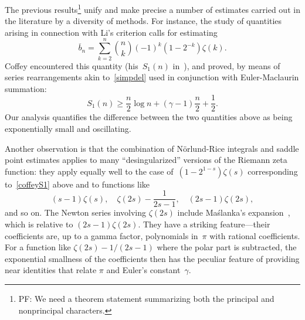 \documentclass{amsart}
\begin{document}
\smallskip
The previous results\footnote{%
	PF: We need a theorem statement summarizing both the principal and nonprincipal
	characters.}
unify and make precise a number of estimates carried out in the literature by a diversity
of methods. For instance, the study of quantities arising in connection with Li's criterion
calls for estimating
\begin{equation}\label{coffeyS1}
\overline{b}_n=\sum_{k=2}^n \binom{n}{k}(-1)^k(1-2^{-k})\zeta(k).
\end{equation}
Coffey encountered this quantity (his~$S_1(n)$ in~\cite{Coffey05}),
and proved, by means of series rearrangements akin to~\eqref{simpdel}
used in conjunction with Euler-Maclaurin summation:
\begin{equation}\label{coffeyineq}
S_1(n)\ge \frac{n}{2}\log n+(\gamma-1)\frac{n}{2}+\frac12.
\end{equation}
Our analysis quantifies  the difference between the two quantities above as
being exponentially small and oscillating.

Another observation is that the combination of N\"orlund-Rice integrals
and saddle point estimates applies to many ``desingularized'' versions of 
the Riemann zeta function: they apply equally well to
the case of~$(1-2^{1-s})\zeta(s)$ corresponding to~\eqref{coffeyS1} above
and to functions like
\[
(s-1)\zeta(s), \quad
\zeta(2s)-\frac{1}{2s-1},\quad
(2s-1)\zeta(2s),
\]
and so on. The 
Newton series involving $\zeta(2s)$ include Ma{\'s}lanka's expansion~\cite{Maslanka01}, which is
relative to $(2s-1)\zeta(2s)$.
They have a striking feature---their coefficients are, up to a gamma factor,
polynomials in~$\pi$ with rational coefficients. 
For a function like $\zeta(2s)-1/(2s-1)$ where the polar part is subtracted,
the exponential smallness of the coefficients
then has the peculiar feature of providing near identities that relate $\pi$ and
Euler's constant~$\gamma$.








\end{document}
